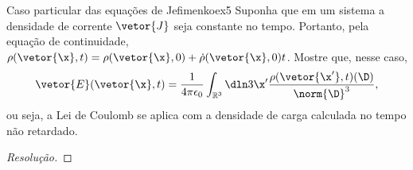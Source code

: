 \begin{exercício}{Caso particular das equações de Jefimenko}{ex5}
   Suponha que em um sistema a densidade de corrente \(\vetor{J}\) seja constante no tempo. Portanto, pela equação de continuidade, \(\rho(\vetor{\x}, t) = \rho(\vetor{\x}, 0) + \dot\rho(\vetor{\x}, 0)t\). Mostre que, nesse caso,
   \begin{equation*}
      \vetor{E}(\vetor{\x}, t) = \frac1{4\pi \epsilon_0} \int_{\mathbb{R}^3} \dln3{\x'} \frac{\rho(\vetor{\x'}, t) (\D)}{\norm{\D}^3},
   \end{equation*}
   ou seja, a Lei de Coulomb se aplica com a densidade de carga calculada no tempo não retardado.
\end{exercício}
\begin{proof}[Resolução]
    
\end{proof}
